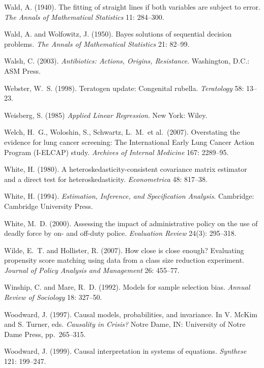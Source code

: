 \smallskip
\noindent
Wald, A. (1940).
The fitting of straight lines if both variables are subject to error.
{\it The Annals of Mathematical Statistics\/} 11: 284--300.

\smallskip
\noindent
Wald, A. and Wolfowitz, J. (1950).
Bayes solutions of sequential decision problems.
{\it The Annals of Mathematical Statistics\/} 21: 82--99.

\smallskip\noindent
Walsh, C. (2003).
{\it Antibiotics: Actions, Origins, Resistance\/}.
Washington, D.C.: ASM Press.

\smallskip\noindent
Webster, W.~S. (1998).
Teratogen update: Congenital rubella.
{\it Teratology\/} 58: 13--23.


\smallskip\noindent
Weisberg, S. (1985)
{\it Applied Linear Regression\/}.
New York: Wiley.

\smallskip\noindent
Welch, H.~G., Woloshin, S., Schwartz, L.~M.~et al.~(2007).
Overstating the evidence for lung cancer screening:
The International Early Lung Cancer Action Program (I-ELCAP) study.
{\it Archives of Internal Medicine\/} 167: 2289--95.

\smallskip\noindent
White, H. (1980).
A heteroskedasticity-consistent covariance matrix estimator and a direct test for heteroskedasticity.
{\it Econometrica\/} 48: 817--38.

\smallskip\noindent
White, H. (1994).
{\it Estimation, Inference, and Specification Analysis\/}.
Cambridge: Cambridge University Press.

\smallskip\noindent
White, M.~D. (2000).
Assessing the impact of administrative policy on the use of deadly force
by on- and off-duty police.
{\it Evaluation Review} 24(3): 295--318.

\smallskip\noindent
Wilde, E.~T. and Hollister, R. (2007).
How close is close enough? Evaluating propensity score matching using
data from a class size reduction experiment.
{\it Journal of Policy Analysis and Management\/} 26: 455--77.

\smallskip\noindent
Winship, C. and Mare, R.~D. (1992).
Models for sample selection bias.
{\it Annual Review of Sociology\/} 18: 327--50.

\smallskip\noindent
Woodward, J. (1997).
Causal models, probabilities, and invariance.
In V. McKim and S. Turner, eds. {\it Causality in Crisis?\/}
Notre Dame, IN: University of Notre Dame Press, pp.~265--315.

\smallskip\noindent
Woodward, J. (1999).
Causal interpretation in systems of equations.
{\it Synthese\/} 121: 199--247.

